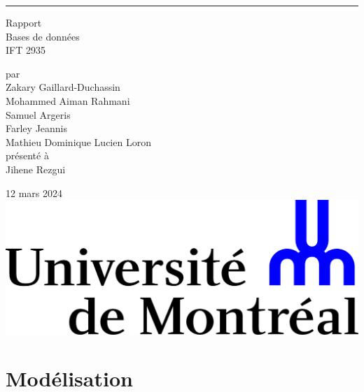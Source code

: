 \documentclass{article}
\begin{document}
\begin{titlepage}
  \centering
  
  \rule{\textwidth}{0px}
  \vspace{15mm}
  
  \Huge{Rapport} \\
  \vspace{5mm}
  \Large Bases de données \\
  IFT 2935
  
  \vspace{40mm}
  \large par \\ \vspace{3mm}
  Zakary Gaillard-Duchassin\\ \vspace{3mm}
  Mohammed Aiman Rahmani \\ \vspace{3mm}
  Samuel Argeris \\ \vspace{3mm}
  Farley Jeannis \\ \vspace{3mm}
  Mathieu Dominique Lucien Loron \\ \vspace{3mm}
  \vspace{30mm}
  présenté à \\ \vspace{3mm}
  Jihene Rezgui
  
  \vfill
  12 mars 2024 \\ \vspace{3mm}
  \includegraphics[scale=0.55]{logo-udem.png}
\end{titlepage}
\newpage

\section{Modélisation}
\end{document}
